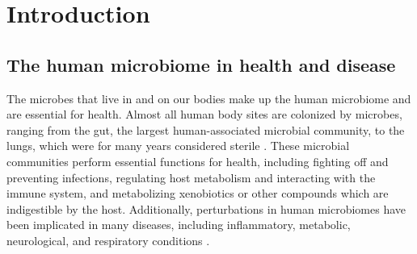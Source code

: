 
\chapter{Introduction}

\section{The human microbiome in health and disease}

The microbes that live in and on our bodies make up the human microbiome and are essential for health.
Almost all human body sites are colonized by microbes, ranging from the gut, the largest human-associated microbial community, to the lungs, which were for many years considered sterile \cite{sender-2016-bhratio,beck-2012-lungmicrobiome}.
These microbial communities perform essential functions for health, including fighting off and preventing infections, regulating host metabolism and interacting with the immune system, and metabolizing xenobiotics or other compounds which are indigestible by the host.
Additionally, perturbations in human microbiomes have been implicated in many diseases, including inflammatory, metabolic, neurological, and respiratory conditions \cite{beck-2012-lungmicrobiome,ibd-papa,ridaura-2013-obfmt,hsiao-2013-autism}.

